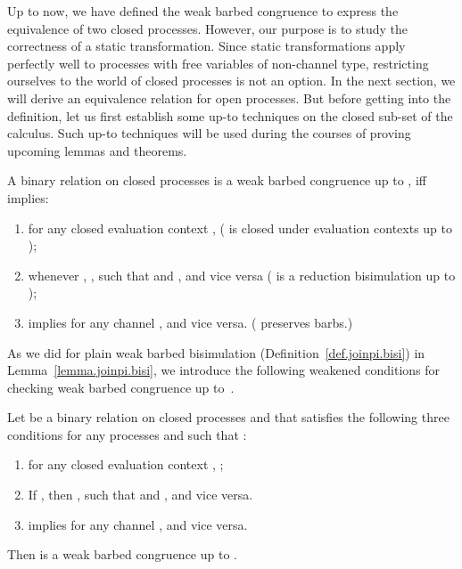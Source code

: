 \documentclass{LMCS}
\renewcommand{\_}{\mathord{\rule[-.25ex]{1ex}{.15ex}}}
\begin{document}
Up to now, we have defined the weak barbed congruence to express the
equivalence of two closed processes. However, our purpose is to study
the correctness of a static transformation. Since static
transformations apply perfectly well to processes with free
variables of non-channel type, restricting ourselves to the world of
closed processes is not an option. In the next section, we will derive
an equivalence relation for open processes. But before getting into
the definition, let us first establish some up-to techniques on the
closed sub-set of the calculus. Such up-to techniques will be used
during the courses of proving upcoming lemmas and theorems.

\begin{defi}
\label{def.wbc-upto-equiv}
A binary relation  on closed processes is a weak barbed congruence
up to , iff  implies:
  \begin{enumerate}[(1)]
  \item for any closed evaluation context ,
     ( is closed
    under evaluation contexts up to );
  \item whenever , , such that  and , and vice versa ( is
    a reduction bisimulation up to );
  \item  implies  for any channel
    , and vice versa. ( preserves barbs.)
  \end{enumerate}
\end{defi}
As we did for plain weak barbed bisimulation
(Definition~\ref{def.joinpi.bisi})
in Lemma~\ref{lemma.joinpi.bisi}, we introduce the following
weakened conditions for checking weak barbed congruence up to~.
\begin{lem}\label{lemma.wbc-upto-equiv-alt}
  Let  be a binary relation on closed processes and  that satisfies the
  following three conditions for any processes  and  such that
  :
  \begin{enumerate}[\em(1)]
  \item for any closed evaluation context ,
    ;
  \item If , then , such that  and , and vice versa.
  \item  implies  for any channel ,
    and vice versa.
  \end{enumerate}
  Then  is a weak barbed congruence up to .
\end{lem}
\end{document}
